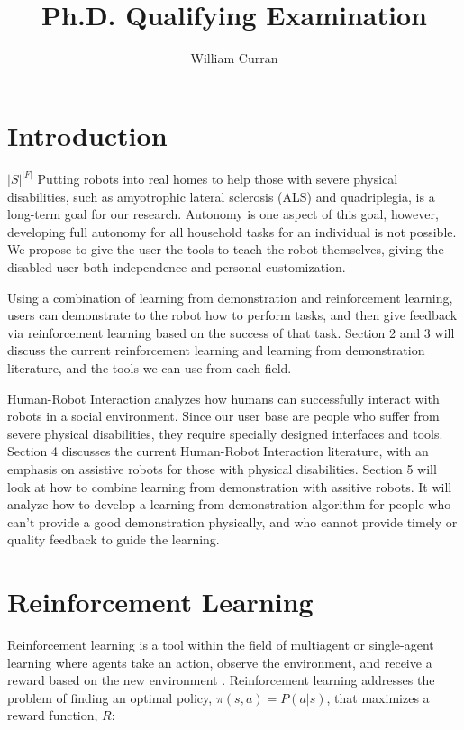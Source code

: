 \documentclass{article}
\title{Ph.D. Qualifying Examination}
\author{William Curran}
\begin{document}
\begin{titlepage}
\maketitle
\tableofcontents
\thispagestyle{empty}
\clearpage
\end{titlepage}

\section{Introduction}
$|S|^{|F|}$
Putting robots into real homes to help those with severe physical disabilities, such as amyotrophic lateral sclerosis (ALS) and quadriplegia, is a long-term goal for our research. Autonomy is one aspect of this goal, however, developing full autonomy for all household tasks for an individual is not possible. We propose to give the user the tools to teach the robot themselves, giving the disabled user both independence and personal customization.

Using a combination of learning from demonstration and reinforcement learning, users can demonstrate to the robot how to perform tasks, and then give feedback via reinforcement learning based on the success of that task. Section 2 and 3 will discuss the current reinforcement learning and learning from demonstration literature, and the tools we can use from each field. 

Human-Robot Interaction analyzes how humans can successfully interact with robots in a social environment. Since our user base are people who suffer from severe physical disabilities, they require specially designed interfaces and tools. Section 4 discusses the current Human-Robot Interaction literature, with an emphasis on assistive robots for those with physical disabilities. Section 5 will look at how to combine learning from demonstration with assitive robots. It will analyze how to develop a learning from demonstration algorithm for people who can't provide a good demonstration physically, and who cannot provide timely or quality feedback to guide the learning. 

\section{Reinforcement Learning}
\label{sec: Reinforcement Learning}
Reinforcement learning is a tool within the field of multiagent or single-agent learning where agents take an action, observe the environment, and receive a reward based on the new environment \cite{Sutton98reinforcementlearning}. Reinforcement learning addresses the problem of finding an optimal policy, $\pi(s,a) = P(a|s)$, that maximizes a reward function, $R$:
\end{document}

